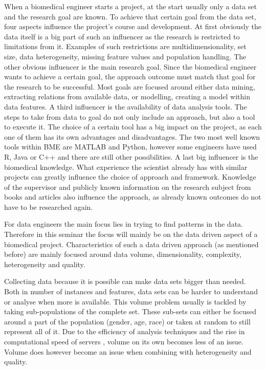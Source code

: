 \documentclass[10pt,a4paper]{article}
\begin{document}
	When a biomedical engineer starts a project, at the start usually only a data set and the research goal are known. To achieve that certain goal from the data set, four aspects influence the project's course and development. At first obviously the data itself is a big part of such an influencer as the research is restricted to limitations from it. Examples of such restrictions are multidimensionality, set size, data heterogeneity, missing feature values and population handling. The other obvious influencer is the main research goal. Since the biomedical engineer wants to achieve a certain goal, the approach outcome must match that goal for the research to be successful. Most goals are focused around either data mining, extracting relations from available data, or modelling, creating a model within data features. A third influencer is the availability of data analysis tools. The steps to take from data to goal do not only include an approach, but also a tool to execute it. The choice of a certain tool has a big impact on the project, as each one of them has its own advantages and disadvantages. The two most well known tools within BME are MATLAB and Python, however some engineers have used R, Java or C++ and there are still other possibilities. A last big influencer is the biomedical knowledge. What experience the scientist already has with similar projects can greatly influence the choice of approach and framework. Knowledge of the supervisor and publicly known information on the research subject from books and articles also influence the approach, as already known outcomes do not have to be researched again. 
	
	For data engineers the main focus lies in trying to find patterns in the data. Therefore in this seminar the focus will mainly be on the data driven aspect of a biomedical project. Characteristics of such a data driven approach (as mentioned before) are mainly focused around data volume, dimensionality, complexity, heterogeneity and quality. \cite{chen2006medical, doi:10.1093/bib/bbx044}
	
	Collecting data because it is possible can make data sets bigger than needed. Both in number of instances and features, data sets can be harder to understand or analyse when more is available. \cite{chen2006medical} This volume problem usually is tackled by taking sub-populations of the complete set. These sub-sets can either be focused around a part of the population (gender, age, race) or taken at random to still represent all of it. Due to the efficiency of analysis techniques and the rise in computational speed of servers \cite{blythe2008rise}, volume on its own becomes less of an issue. Volume does however become an issue when combining with heterogeneity and quality. \cite{Turkay2014, Holzinger2014} 
	
\end{document}
